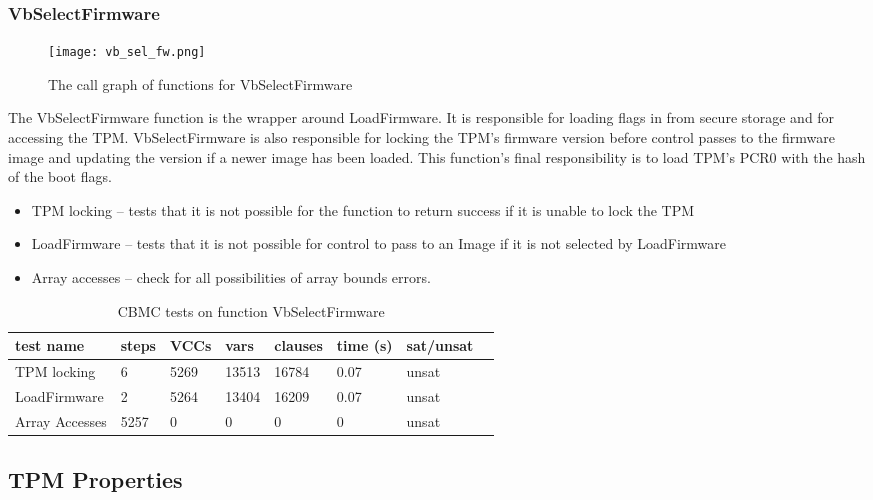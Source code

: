 \documentclass[../report.tex]{subfiles}
\begin{document}
\subsubsection{VbSelectFirmware}

\begin{figure}[!htbp]
  \centering
  \texttt{[image: vb\_sel\_fw.png]}
  \caption{The call graph of functions for VbSelectFirmware}\label{fig:vbselfw}
\end{figure}

The VbSelectFirmware function is the wrapper around LoadFirmware.
It is responsible for loading flags in from secure storage and for accessing the TPM\@.
VbSelectFirmware is also responsible for locking the TPM's firmware version before control passes to the firmware image and updating the version if a newer image has been loaded.
This function's final responsibility is to load TPM's PCR0 with the hash of the boot flags.

\begin{itemize}
 \item  TPM locking -- tests that it is not possible for the function to return success if it is unable to lock the TPM
 \item  LoadFirmware -- tests that it is not possible for control to pass to an Image if it is not selected by LoadFirmware
 \item  Array accesses -- check for all possibilities of array bounds errors.
\end{itemize}

\begin{table}[]
    \centering
    \caption{CBMC tests on function VbSelectFirmware}\label{sfw_results}
    \begin{tabular}{|l|l|l|l|l|l|l|l|}
        \hline
        test name & steps & VCCs & vars  & clauses & time (s) & sat/unsat  \\ \hline \hline
        TPM locking & 6 & 5269 & 13513 & 16784 & 0.07 & unsat \\ \hline
        LoadFirmware & 2 & 5264 & 13404 & 16209 & 0.07 & unsat \\ \hline
        Array Accesses & 5257 & 0 & 0 & 0 & 0 &  unsat \\ \hline
    \end{tabular}
\end{table}

\subsection{TPM Properties}
\end{document}
